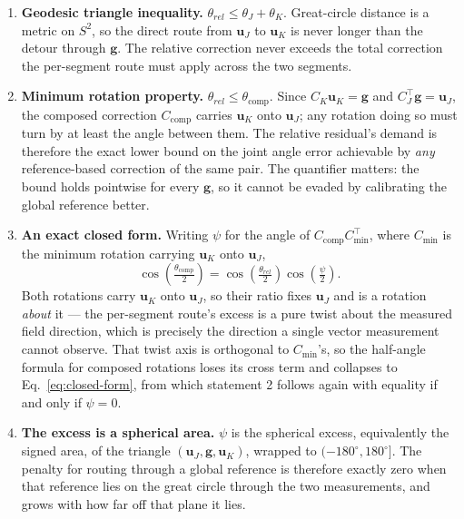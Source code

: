 \begin{enumerate}
  \item \textbf{Geodesic triangle inequality.}
    $\theta_{rel} \le \theta_J + \theta_K$. Great-circle distance is a metric on $S^2$, so the
    direct route from $\mathbf{u}_J$ to $\mathbf{u}_K$ is never longer than the detour through
    $\mathbf{g}$. The relative correction never exceeds the total correction the per-segment
    route must apply across the two segments.

  \item \textbf{Minimum rotation property.}
    $\theta_{rel} \le \theta_{\mathrm{comp}}$. Since $C_K \mathbf{u}_K = \mathbf{g}$ and
    $C_J^{\top}\mathbf{g} = \mathbf{u}_J$, the composed correction $C_{\mathrm{comp}}$ carries
    $\mathbf{u}_K$ onto $\mathbf{u}_J$; any rotation doing so must turn by at least the angle
    between them. The relative residual's demand is therefore the exact lower bound on the joint
    angle error achievable by \emph{any} reference-based correction of the same pair. The
    quantifier matters: the bound holds pointwise for every $\mathbf{g}$, so it cannot be evaded
    by calibrating the global reference better.

  \item \textbf{An exact closed form.} Writing $\psi$ for the angle of
    $C_{\mathrm{comp}} C_{\min}^{\top}$, where $C_{\min}$ is the minimum rotation carrying
    $\mathbf{u}_K$ onto $\mathbf{u}_J$,
    \begin{equation}
      \cos\!\left(\tfrac{\theta_{\mathrm{comp}}}{2}\right)
        = \cos\!\left(\tfrac{\theta_{rel}}{2}\right)\cos\!\left(\tfrac{\psi}{2}\right).
      \label{eq:closed-form}
    \end{equation}
    Both rotations carry $\mathbf{u}_K$ onto $\mathbf{u}_J$, so their ratio fixes
    $\mathbf{u}_J$ and is a rotation \emph{about} it --- the per-segment route's excess is a pure
    twist about the measured field direction, which is precisely the direction a single vector
    measurement cannot observe. That twist axis is orthogonal to $C_{\min}$'s, so the half-angle
    formula for composed rotations loses its cross term and collapses to
    Eq.~\eqref{eq:closed-form}, from which statement 2 follows again with equality if and only if
    $\psi = 0$.

  \item \textbf{The excess is a spherical area.} $\psi$ is the spherical excess, equivalently the
    signed area, of the triangle $(\mathbf{u}_J, \mathbf{g}, \mathbf{u}_K)$, wrapped to
    $(-180^\circ, 180^\circ]$. The penalty for routing through a global reference is therefore
    exactly zero when that reference lies on the great circle through the two measurements, and
    grows with how far off that plane it lies.
\end{enumerate}

